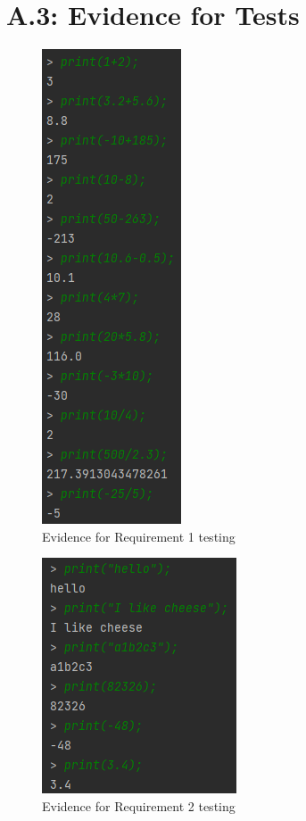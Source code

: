 \documentclass[a4paper, oneside, 11pt]{report}
\begin{document}
\section{A.3: Evidence for Tests}
\newpage
\begin{figure}
\includegraphics{Requirement 1.PNG}
\caption{Evidence for Requirement 1 testing}
\end{figure}

\begin{figure}
\includegraphics{Requirement 2.PNG}
\caption{Evidence for Requirement 2 testing}
\end{figure}
\end{document}
